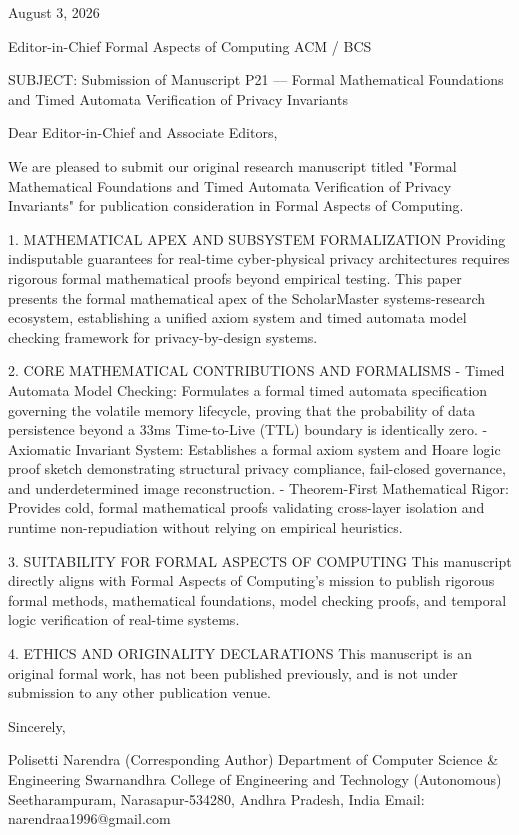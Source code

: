 August 3, 2026

Editor-in-Chief
Formal Aspects of Computing
ACM / BCS

SUBJECT: Submission of Manuscript P21 — Formal Mathematical Foundations and Timed Automata Verification of Privacy Invariants

Dear Editor-in-Chief and Associate Editors,

We are pleased to submit our original research manuscript titled "Formal Mathematical Foundations and Timed Automata Verification of Privacy Invariants" for publication consideration in Formal Aspects of Computing.

1. MATHEMATICAL APEX AND SUBSYSTEM FORMALIZATION
Providing indisputable guarantees for real-time cyber-physical privacy architectures requires rigorous formal mathematical proofs beyond empirical testing. This paper presents the formal mathematical apex of the ScholarMaster systems-research ecosystem, establishing a unified axiom system and timed automata model checking framework for privacy-by-design systems.

2. CORE MATHEMATICAL CONTRIBUTIONS AND FORMALISMS
  - Timed Automata Model Checking: Formulates a formal timed automata specification governing the volatile memory lifecycle, proving that the probability of data persistence beyond a 33ms Time-to-Live (TTL) boundary is identically zero.
  - Axiomatic Invariant System: Establishes a formal axiom system and Hoare logic proof sketch demonstrating structural privacy compliance, fail-closed governance, and underdetermined image reconstruction.
  - Theorem-First Mathematical Rigor: Provides cold, formal mathematical proofs validating cross-layer isolation and runtime non-repudiation without relying on empirical heuristics.

3. SUITABILITY FOR FORMAL ASPECTS OF COMPUTING
This manuscript directly aligns with Formal Aspects of Computing's mission to publish rigorous formal methods, mathematical foundations, model checking proofs, and temporal logic verification of real-time systems.

4. ETHICS AND ORIGINALITY DECLARATIONS
This manuscript is an original formal work, has not been published previously, and is not under submission to any other publication venue.

Sincerely,

Polisetti Narendra (Corresponding Author)
Department of Computer Science & Engineering
Swarnandhra College of Engineering and Technology (Autonomous)
Seetharampuram, Narasapur-534280, Andhra Pradesh, India
Email: narendraa1996@gmail.com
